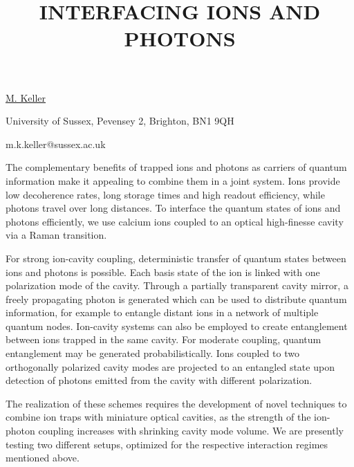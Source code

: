 \title{INTERFACING IONS AND PHOTONS}

\underline{M. Keller} 

{\normalsize{\vspace{-4mm}
University of Sussex,
Pevensey 2,
Brighton, BN1 9QH

\email m.k.keller@sussex.ac.uk}}

The complementary benefits of trapped ions and photons as carriers of quantum information make
it appealing to combine them in a joint system. Ions provide low decoherence rates, long
storage times and high readout efficiency, while photons travel over long distances. To
interface the quantum states of ions and photons efficiently, we use calcium ions coupled to an
optical high-finesse cavity via a Raman transition.

For strong ion-cavity coupling, deterministic transfer of quantum states between ions and
photons is possible. Each basis state of the ion is linked with one polarization mode of the
cavity. Through a partially transparent cavity mirror, a freely propagating photon is generated
which can be used to distribute quantum information, for example to entangle distant ions in a
network of multiple quantum nodes. Ion-cavity systems can also be employed to create
entanglement between ions trapped in the same cavity. For moderate coupling, quantum
entanglement may be generated probabilistically. Ions coupled to two orthogonally polarized
cavity modes are projected to an entangled state upon detection of photons emitted from the
cavity with different polarization.

The realization of these schemes requires the development of novel techniques to combine ion
traps with miniature optical cavities, as the strength of the ion-photon coupling increases
with shrinking cavity mode volume. We are presently testing two different setups, optimized for
the respective interaction regimes mentioned above.


\vspace{\baselineskip} 